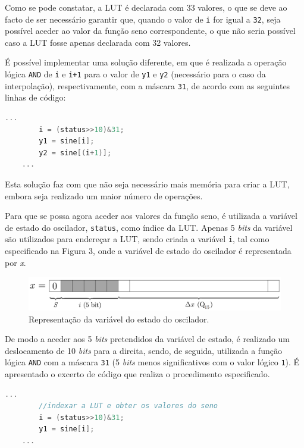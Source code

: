 \documentclass[11pt]{article}
\numberwithin{equation}{section}
\begin{document}
Como se pode constatar, a LUT é declarada com 33 valores, o que se deve ao facto de ser necessário garantir que, quando o valor de \texttt{i} for igual a \texttt{32}, seja possível aceder ao valor da função seno correspondente, o que não seria possível caso a LUT fosse apenas declarada com 32 valores.
 
É possível implementar uma solução diferente, em que é realizada a operação lógica \texttt{AND} de \texttt{i} e \texttt{i+1} para o valor de \texttt{y1} e \texttt{y2} (necessário para o caso  da interpolação), 
respectivamente, com a máscara \texttt{31}, de acordo com as seguintes linhas de código:

\begin{lstlisting}[language=C]
	...
		i = (status>>10)&31;
		y1 = sine[i];
		y2 = sine[(i+1)];
	...
\end{lstlisting}

Esta solução faz com que não seja necessário mais memória para criar a LUT, embora seja realizado um maior número de operações.  

Para que se possa agora aceder aos valores da função seno, é utilizada a variável de estado do oscilador, \texttt{status}, como índice da LUT. Apenas 5 \textit{bits} da variável são utilizados para endereçar a LUT, sendo criada a variável \texttt{i}, tal como especificado na Figura 3, onde a variável de estado do oscilador é representada por \textit{x}.

\begin{figure}[H]
	\centering
	\includegraphics[keepaspectratio=true, scale=0.27]{teoricas/seno}
	\caption{Representação da variável do estado do oscilador.}
	\vspace{-0.8em}
	\label{fig:variavelestado}
\end{figure}

De modo a aceder aos 5 \textit{bits} pretendidos da variável de estado, é realizado um deslocamento de 10 \textit{bits} para a direita, sendo, de seguida, utilizada a função lógica \texttt{AND} com a máscara \texttt{31} (5 \textit{bits} menos significativos com o valor lógico \texttt{1}). É apresentado o excerto de código que realiza o procedimento especificado. 

\begin{lstlisting}[language=C]
	...
		//indexar a LUT e obter os valores do seno
		i = (status>>10)&31;
		y1 = sine[i]; 
	...
\end{lstlisting}
\end{document}
